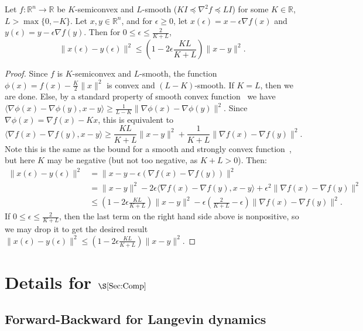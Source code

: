\documentclass[final,12pt]{colt2018}
\newcommand{\R}{\mathbb{R}}
\begin{document}
\begin{lemma}\label{Lem:SemiConvex}
Let $f \colon \R^n \to \R$ be $K$-semiconvex and $L$-smooth ($KI \preceq \nabla^2 f \preceq LI$) for some $K \in \R$, $L > \max\{0,-K\}$.
Let $x,y \in \R^n$, and for $\epsilon \ge 0$, let $x(\epsilon) = x - \epsilon \nabla f(x)$ and $y(\epsilon) = y-\epsilon \nabla f(y)$.
Then for $0 \le \epsilon \le \frac{2}{K+L}$,
$$\|x(\epsilon)-y(\epsilon)\|^2 \le \left(1-2\epsilon\frac{KL}{K+L}\right) \|x-y\|^2.$$ 
\end{lemma}
\begin{proof}
Since $f$ is $K$-semiconvex and $L$-smooth, the function $\phi(x) = f(x) - \frac{K}{2}\|x\|^2$ is convex and $(L-K)$-smooth.
If $K = L$, then we are done.
Else, by a standard property of smooth convex function~\cite[Theorem~2.1.5]{Nesterov04} we have
$\langle \nabla \phi(x) - \nabla \phi(y), x-y \rangle \ge \frac{1}{L-K} \|\nabla \phi(x)-\nabla \phi(y)\|^2$.
Since $\nabla \phi(x) = \nabla f(x) - Kx$, this is equivalent to
$$\langle \nabla f(x)-\nabla f(y),x-y\rangle \ge \frac{KL}{K+L}\|x-y\|^2 + \frac{1}{K+L} \|\nabla f(x)-\nabla f(y)\|^2.$$
Note this is the same as the bound for a smooth and strongly convex function~\cite[Theorem~2.1.12]{Nesterov04}, but here $K$ may be negative (but not too negative, as $K+L>0$).
Then:
\begin{align*}
\|x(\epsilon)-y(\epsilon)\|^2 &= \|x-y-\epsilon(\nabla f(x)-\nabla f(y))\|^2 \\
&= \|x-y\|^2 - 2\epsilon \langle \nabla f(x)-\nabla f(y),x-y\rangle + \epsilon^2 \|\nabla f(x)-\nabla f(y)\|^2 \\
&\le \left(1-2\epsilon\frac{KL}{K+L}\right) \|x-y\|^2 - \epsilon \left(\frac{2}{K+L} - \epsilon\right)\|\nabla f(x)-\nabla f(y)\|^2.
\end{align*}
If $0 \le \epsilon \le \frac{2}{K+L}$, then the last term on the right hand side above is nonpositive, so we may drop it to get the desired result
$\|x(\epsilon)-y(\epsilon)\|^2 \le \left(1-2\epsilon\frac{KL}{K+L}\right) \|x-y\|^2.$
\end{proof}


\section{Details for $\S\ref{Sec:Comp}$}

\subsection{Forward-Backward for Langevin dynamics}
\label{App:FBLang}
\end{document}
